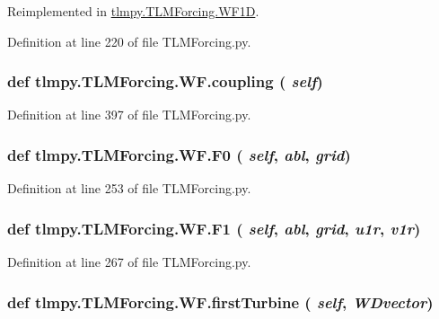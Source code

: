 Reimplemented in \hyperlink{classtlmpy_1_1TLMForcing_1_1WF1D_a90bf21d2ff880d26f71e0a5b4b763e1c}{tlmpy.TLMForcing.WF1D}.

Definition at line 220 of file TLMForcing.py.\hypertarget{classtlmpy_1_1TLMForcing_1_1WF_a787cd7715b02a4d1db43546e184bea65}{
\subsubsection[{coupling}]{\setlength{\rightskip}{0pt plus 5cm}def tlmpy.TLMForcing.WF.coupling ( {\em self})}}
\label{classtlmpy_1_1TLMForcing_1_1WF_a787cd7715b02a4d1db43546e184bea65}


Definition at line 397 of file TLMForcing.py.\hypertarget{classtlmpy_1_1TLMForcing_1_1WF_aacd124824020f89ee268460bb6452614}{
\subsubsection[{F0}]{\setlength{\rightskip}{0pt plus 5cm}def tlmpy.TLMForcing.WF.F0 ( {\em self}, \/   {\em abl}, \/   {\em grid})}}
\label{classtlmpy_1_1TLMForcing_1_1WF_aacd124824020f89ee268460bb6452614}


Definition at line 253 of file TLMForcing.py.\hypertarget{classtlmpy_1_1TLMForcing_1_1WF_af79e6e6b7d0321ac7a6fc9667936785b}{
\subsubsection[{F1}]{\setlength{\rightskip}{0pt plus 5cm}def tlmpy.TLMForcing.WF.F1 ( {\em self}, \/   {\em abl}, \/   {\em grid}, \/   {\em u1r}, \/   {\em v1r})}}
\label{classtlmpy_1_1TLMForcing_1_1WF_af79e6e6b7d0321ac7a6fc9667936785b}


Definition at line 267 of file TLMForcing.py.\hypertarget{classtlmpy_1_1TLMForcing_1_1WF_ad751eb15874518d066aed82ad5c6742e}{
\subsubsection[{firstTurbine}]{\setlength{\rightskip}{0pt plus 5cm}def tlmpy.TLMForcing.WF.firstTurbine ( {\em self}, \/   {\em WDvector})}}
\label{classtlmpy_1_1TLMForcing_1_1WF_ad751eb15874518d066aed82ad5c6742e}


